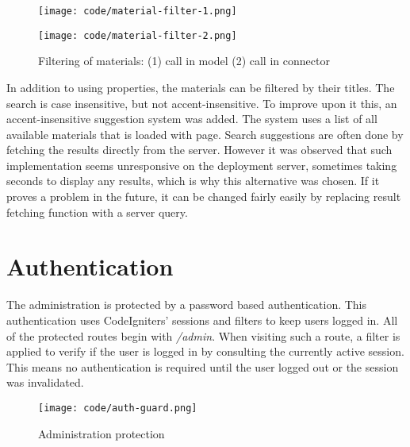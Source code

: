 \documentclass[
  digital,     %
  oneside,     %
  nosansbold,  %
  colorbold, %
  lof,         %
  lot,         %
]{fithesis4}
\begin{document}
\begin{figure}[!htbp]
	\begin{center}
		\begin{minipage}{.8\textwidth}
			\texttt{[image: code/material-filter-1.png]}
		\end{minipage}
		\begin{minipage}{.8\textwidth}
			\texttt{[image: code/material-filter-2.png]}
		\end{minipage}
	\end{center}
	\caption{Filtering of materials: (1) call in model (2) call in connector }
	\label{fig:material-filter}
\end{figure}

In addition to using properties, the materials can be filtered by their titles. The search is case
insensitive, but not accent-insensitive. To improve upon it this, an accent-insensitive suggestion system
was added. The system uses a list of all available materials that is loaded with page. Search
suggestions are often done by fetching the results directly from the server. However it was observed
that such implementation seems unresponsive on the deployment server, sometimes taking seconds
to display any results, which is why this alternative was chosen. If it proves a problem in the future, it
can be changed fairly easily by replacing result fetching function with a server query.

\section{Authentication}
\label{sect:authentication}

The administration is protected by a password based authentication. This authentication uses
CodeIgniters' sessions and filters to keep users logged in. All of the protected routes begin with
\textit{/admin}. When visiting such a route, a filter is applied to verify if the user is logged in by
consulting the currently active session. This means no authentication is required until the user logged
out or the session was invalidated. 

\begin{figure}[!htbp]
	\begin{center}
		\begin{minipage}{.8\textwidth}
			\texttt{[image: code/auth-guard.png]}
		\end{minipage}
	\end{center}
	\caption{Administration protection}
	\label{fig:auth-guard}
\end{figure}
\end{document}
